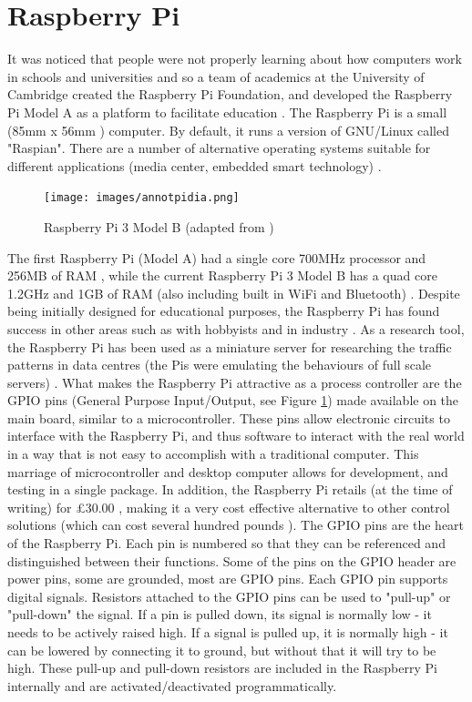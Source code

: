 \documentclass[twoside,a4]{report}
\def\br{\newline \newline \noindent}
\begin{document}
	\section*{Raspberry Pi}
	It was noticed that people were not properly learning about how computers work in schools and universities and so a team of academics at the University of Cambridge created the Raspberry Pi Foundation, and developed the Raspberry Pi Model A as a platform to facilitate education \cite{pihistory}. The Raspberry Pi is a small (85mm x 56mm \cite{pi3mechdraw}) computer. By default, it runs a version of GNU/Linux called "Raspian". There are a number of alternative operating systems suitable for different applications (media center, embedded smart technology) \cite{piotheros}.  \newline
	\begin{figure}[!htb]
		\centering
		\texttt{[image: images/annotpidia.png]} %
		\caption{Raspberry Pi 3 Model B (adapted from  \cite{pi3info})}
		\label{pidia}
	\end{figure} 
	\newline
	\noindent
	The first Raspberry Pi (Model A) had a single core 700MHz processor and 256MB of RAM \cite{pi1info}, while the current Raspberry Pi 3 Model B has a quad core 1.2GHz and 1GB of RAM (also including built in WiFi and Bluetooth) \cite{pi3info}. 
	\br
	Despite being initially designed for educational purposes, the Raspberry Pi has found success in other areas such as with hobbyists \cite{pihobbynotedu} and in industry \cite{pimorethanedu}. As a research tool, the Raspberry Pi has been used as a miniature server for researching the traffic patterns in data centres (the Pis were emulating the behaviours of full scale servers) \cite{piglasgowdc}.
	\br
	What makes the Raspberry Pi attractive as a process controller are the GPIO pins (General Purpose Input/Output, see Figure \ref{pidia}) made available on the main board, similar to a microcontroller. These pins allow electronic circuits to interface with the Raspberry Pi, and thus software to interact with the real world in a way that is not easy to accomplish with a traditional computer. This marriage of microcontroller and desktop computer allows for development, and testing in a single package. In addition, the Raspberry Pi retails (at the time of writing) for \pounds 30.00 \cite{picost}, making it a very cost effective alternative to other control solutions (which can cost several hundred pounds \cite{otherpcucost}). 
	\br
	The GPIO pins are the heart of the Raspberry Pi. Each pin is numbered so that they can be referenced and distinguished between their functions. Some of the pins on the GPIO header are power pins, some are grounded, most are GPIO pins. Each GPIO pin supports digital signals. Resistors attached to the GPIO pins can be used to "pull-up" or "pull-down" the signal. If a pin is pulled down, its signal is normally low - it needs to be actively raised high. If a signal is pulled up, it is normally high - it can be lowered by connecting it to ground, but without that it will try to be high. These pull-up and pull-down resistors are included in the Raspberry Pi internally and are activated/deactivated programmatically.
	
\end{document}
